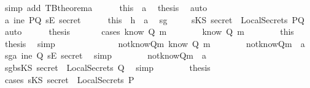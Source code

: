 \begin{isabellebody}
\ {\isacharparenleft}simp\ add{\isacharcolon}\ TBtheorem{}a{\isacharparenright}\isanewline
\ \ \ \ \isamarkupfalse%
\ this\ \ a{}\ \isamarkupfalse%
\ {\isacharquery}thesis\ \isamarkupfalse%
\ auto\isanewline
\ \ \isamarkupfalse%
\isanewline
\ \ \ \ \isamarkupfalse%
\ a{}{}{\isacharcolon}{\isachardoublequoteopen}{\isasymnot}\ ine\ PQ\ {\isacharparenleft}sE\ secret{\isacharparenright}{\isachardoublequoteclose}\isanewline
\ \ \ \ \isamarkupfalse%
\ this\ \ h{}\ \ a{}\ \isamarkupfalse%
\ sg{}{\isacharcolon}\isanewline
\ \ \ \ \ {\isachardoublequoteopen}sKS\ secret\ {\isasymin}\ LocalSecrets\ PQ{\isachardoublequoteclose}\ \isamarkupfalse%
\ auto\isanewline
\ \ \ \ \isamarkupfalse%
\ {\isacharquery}thesis\ \isanewline
\ \ \ \ \isamarkupfalse%
\ {\isacharparenleft}cases\ {\isachardoublequoteopen}know\ Q\ m{\isachardoublequoteclose}{\isacharparenright}\isanewline
\ \ \ \ \ \ \isamarkupfalse%
\ {\isachardoublequoteopen}know\ Q\ m{\isachardoublequoteclose}\isanewline
\ \ \ \ \ \ \isamarkupfalse%
\ this\ \isamarkupfalse%
\ {\isacharquery}thesis\ \isamarkupfalse%
\ simp\isanewline
\ \ \ \ \isamarkupfalse%
\ \isanewline
\ \ \ \ \ \ \isamarkupfalse%
\ not{\isacharunderscore}knowQm{\isacharcolon}{\isachardoublequoteopen}{\isasymnot}\ know\ Q\ m{\isachardoublequoteclose}\isanewline
\ \ \ \ \ \ \isamarkupfalse%
\ not{\isacharunderscore}knowQm\ \ a{}\ \isamarkupfalse%
\ sg{}a{\isacharcolon}{\isachardoublequoteopen}{\isasymnot}\ ine\ Q\ {\isacharparenleft}sE\ secret{\isacharparenright}{\isachardoublequoteclose}\ \isamarkupfalse%
\ simp\isanewline
\ \ \ \ \ \ \isamarkupfalse%
\ not{\isacharunderscore}knowQm\ \ a{}\ \isamarkupfalse%
\ sg{}b{\isacharcolon}{\isachardoublequoteopen}sKS\ secret\ {\isasymnotin}\ LocalSecrets\ Q{\isachardoublequoteclose}\ \isamarkupfalse%
\ simp\isanewline
\ \ \ \ \ \ \isamarkupfalse%
\ {\isacharquery}thesis\isanewline
\ \ \ \ \ \ \isamarkupfalse%
\ {\isacharparenleft}cases\ {\isachardoublequoteopen}sKS\ secret\ {\isasymin}\ LocalSecrets\ P{\isachardoublequoteclose}{\isacharparenright}\isanewline

\end{isabellebody}
